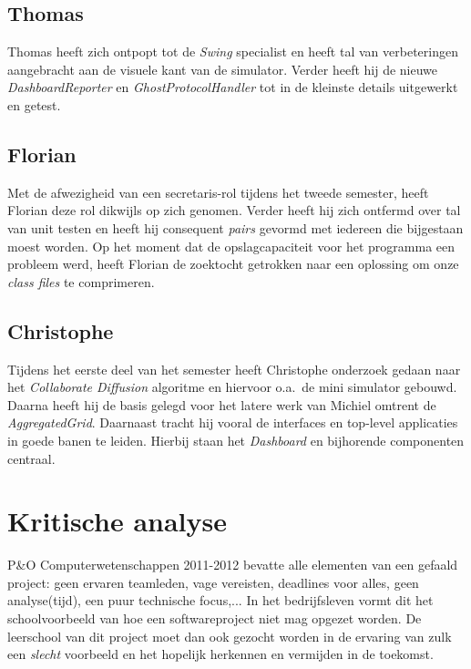 \documentclass[12pt,a4paper]{report}
\begin{document}
\section{Thomas}

Thomas heeft zich ontpopt tot de \emph{Swing} specialist en heeft tal van verbeteringen aangebracht aan de visuele kant van de simulator. Verder heeft hij de nieuwe \emph{DashboardReporter} en \emph{GhostProtocolHandler} tot in de kleinste details uitgewerkt en getest.

\section{Florian}

Met de afwezigheid van een secretaris-rol tijdens het tweede semester, heeft Florian deze rol dikwijls op zich genomen. Verder heeft hij zich ontfermd over tal van unit testen en heeft hij consequent \emph{pairs} gevormd met iedereen die bijgestaan moest worden. Op het moment dat de opslagcapaciteit voor het programma een probleem werd, heeft Florian de zoektocht getrokken naar een oplossing om onze \emph{class files} te comprimeren.

\section{Christophe}

Tijdens het eerste deel van het semester heeft Christophe onderzoek gedaan naar het \emph{Collaborate Diffusion} algoritme en hiervoor o.a.\ de mini simulator gebouwd. Daarna heeft hij de basis gelegd voor het latere werk van Michiel omtrent de \emph{AggregatedGrid}. Daarnaast tracht hij vooral de interfaces en top-level applicaties in goede banen te leiden. Hierbij staan het \emph{Dashboard} en bijhorende componenten centraal.

\chapter{Kritische analyse}

P\&O Computerwetenschappen 2011-2012 bevatte alle elementen van een gefaald project: geen ervaren teamleden, vage vereisten, deadlines voor alles, geen analyse(tijd), een puur technische focus,... In het bedrijfsleven vormt dit het schoolvoorbeeld van hoe een softwareproject niet mag opgezet worden. De leerschool van dit project moet dan ook gezocht worden in de ervaring van zulk een \emph{slecht} voorbeeld en het hopelijk herkennen en vermijden in de toekomst.
\end{document}
